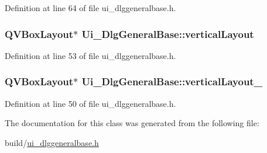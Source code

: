 Definition at line 64 of file ui\+\_\+dlggeneralbase.\+h.

\hypertarget{classUi__DlgGeneralBase_a66524be0ec0dc019bbc7f31e2fd50526}{
\subsubsection[{vertical\+Layout}]{\setlength{\rightskip}{0pt plus 5cm}Q\+V\+Box\+Layout$\ast$ Ui\+\_\+\+Dlg\+General\+Base\+::vertical\+Layout}}\label{classUi__DlgGeneralBase_a66524be0ec0dc019bbc7f31e2fd50526}


Definition at line 53 of file ui\+\_\+dlggeneralbase.\+h.

\hypertarget{classUi__DlgGeneralBase_a3f67713f653ddd26bc82cb90b4836bd4}{
\subsubsection[{vertical\+Layout\+\_\+3}]{\setlength{\rightskip}{0pt plus 5cm}Q\+V\+Box\+Layout$\ast$ Ui\+\_\+\+Dlg\+General\+Base\+::vertical\+Layout\+\_}}\label{classUi__DlgGeneralBase_a3f67713f653ddd26bc82cb90b4836bd4}


Definition at line 50 of file ui\+\_\+dlggeneralbase.\+h.



The documentation for this class was generated from the following file\+:\begin{DoxyCompactItemize}
\item 
build/\hyperlink{ui__dlggeneralbase_8h}{ui\+\_\+dlggeneralbase.\+h}\end{DoxyCompactItemize}
